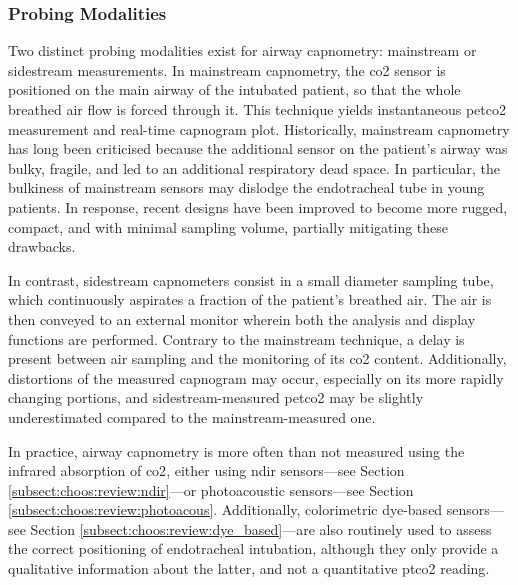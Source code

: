 
\subsubsection{Probing Modalities}

Two distinct probing modalities exist for airway capnometry: mainstream or sidestream measurements. In mainstream capnometry, the \gls{co2} sensor is positioned on the main airway of the intubated patient, so that the whole breathed air flow is forced through it. This technique yields instantaneous \gls{petco2} measurement and real-time capnogram plot. Historically, mainstream capnometry has long been criticised because the additional sensor on the patient's airway was bulky, fragile, and led to an additional respiratory dead space. In particular, the bulkiness of mainstream sensors may dislodge the endotracheal tube in young patients\cite{siobal2016, hochwald2019}. In response, recent designs have been improved to become more rugged, compact, and with minimal sampling volume, partially mitigating these drawbacks\cite{jaffe2002, barter2012}.

In contrast, sidestream capnometers consist in a small diameter sampling tube, which continuously aspirates a fraction of the patient's breathed air. The air is then conveyed to an external monitor wherein both the analysis and display functions are performed. Contrary to the mainstream technique, a delay is present between air sampling and the monitoring of its \gls{co2} content\cite{capnography_gravenstein}. Additionally, distortions of the measured capnogram may occur, especially on its more rapidly changing portions, and sidestream-measured \gls{petco2} may be slightly underestimated compared to the mainstream-measured one\cite{balogh2016}.

In practice, airway capnometry is more often than not measured using the infrared absorption of \gls{co2}, either using \gls{ndir} sensors---see Section \ref{subsect:choos:review:ndir}---or photoacoustic sensors---see Section \ref{subsect:choos:review:photoacous}\cite{capnography_gravenstein, siobal2016}. Additionally, colorimetric dye-based sensors---see Section \ref{subsect:choos:review:dye_based}---are also routinely used to assess the correct positioning of endotracheal intubation, although they only provide a qualitative information about the latter, and not a quantitative \gls{ptco2} reading\cite{nakatani1999}.



